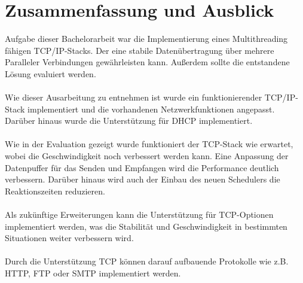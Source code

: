 \chapter{Zusammenfassung und Ausblick}

Aufgabe dieser Bachelorarbeit war die Implementierung eines Multithreading fähigen TCP/IP-Stacks. Der eine stabile Datenübertragung über mehrere Paralleler Verbindungen gewährleisten kann. Außerdem sollte die entstandene Lösung evaluiert werden. \\\\
Wie dieser Ausarbeitung zu entnehmen ist wurde ein funktionierender TCP/IP-Stack implementiert und die vorhandenen Netzwerkfunktionen angepasst. Darüber hinaus wurde die Unterstützung für DHCP implementiert. \\\\
Wie in der Evaluation gezeigt wurde funktioniert der TCP-Stack wie erwartet, wobei die Geschwindigkeit noch verbessert werden kann. Eine Anpassung der Datenpuffer für das Senden und Empfangen wird die Performance deutlich verbessern. Darüber hinaus wird auch der Einbau des neuen Schedulers die Reaktionszeiten reduzieren. \\\\
Als zukünftige Erweiterungen kann die Unterstützung für TCP-Optionen implementiert werden, was die Stabilität und Geschwindigkeit in bestimmten Situationen weiter verbessern wird.\\\\
Durch die Unterstützung TCP können darauf aufbauende Protokolle wie z.B. HTTP, FTP oder SMTP implementiert werden. 


